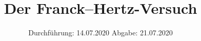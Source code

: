 

\subject{Versuch Nr. 601}
\title{Der Franck--Hertz-Versuch} %
\date{%
  Durchführung: 14.07.2020
  \hspace{3em}
  Abgabe: 21.07.2020
}


\setlength{\parindent}{0pt} %

\maketitle
\thispagestyle{empty}
\tableofcontents
\newpage






%

\printbibliography{}


